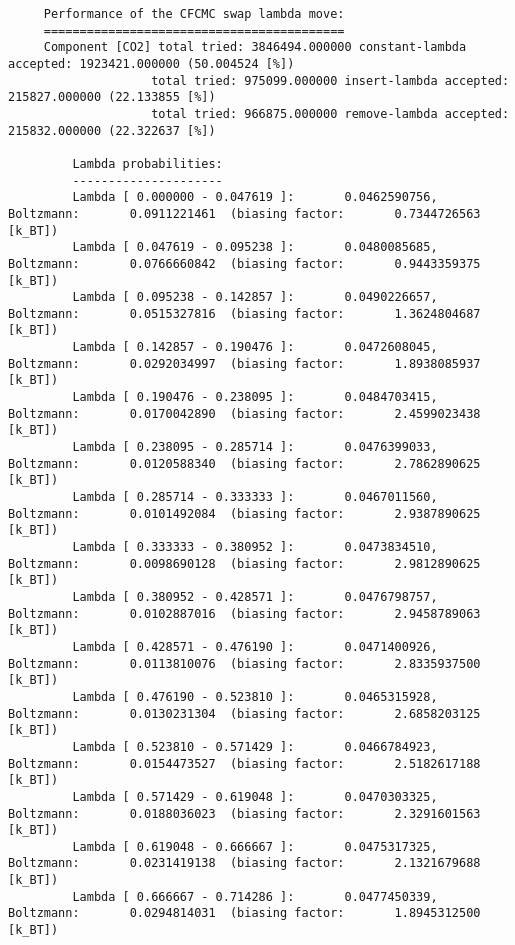 \begin{tiny}
\begin{verbatim}
     Performance of the CFCMC swap lambda move:
     ==========================================
     Component [CO2] total tried: 3846494.000000 constant-lambda accepted: 1923421.000000 (50.004524 [%])
                    total tried: 975099.000000 insert-lambda accepted: 215827.000000 (22.133855 [%])
                    total tried: 966875.000000 remove-lambda accepted: 215832.000000 (22.322637 [%])

         Lambda probabilities:
         ---------------------
         Lambda [ 0.000000 - 0.047619 ]:       0.0462590756, Boltzmann:       0.0911221461  (biasing factor:       0.7344726563 [k_BT])
         Lambda [ 0.047619 - 0.095238 ]:       0.0480085685, Boltzmann:       0.0766660842  (biasing factor:       0.9443359375 [k_BT])
         Lambda [ 0.095238 - 0.142857 ]:       0.0490226657, Boltzmann:       0.0515327816  (biasing factor:       1.3624804687 [k_BT])
         Lambda [ 0.142857 - 0.190476 ]:       0.0472608045, Boltzmann:       0.0292034997  (biasing factor:       1.8938085937 [k_BT])
         Lambda [ 0.190476 - 0.238095 ]:       0.0484703415, Boltzmann:       0.0170042890  (biasing factor:       2.4599023438 [k_BT])
         Lambda [ 0.238095 - 0.285714 ]:       0.0476399033, Boltzmann:       0.0120588340  (biasing factor:       2.7862890625 [k_BT])
         Lambda [ 0.285714 - 0.333333 ]:       0.0467011560, Boltzmann:       0.0101492084  (biasing factor:       2.9387890625 [k_BT])
         Lambda [ 0.333333 - 0.380952 ]:       0.0473834510, Boltzmann:       0.0098690128  (biasing factor:       2.9812890625 [k_BT])
         Lambda [ 0.380952 - 0.428571 ]:       0.0476798757, Boltzmann:       0.0102887016  (biasing factor:       2.9458789063 [k_BT])
         Lambda [ 0.428571 - 0.476190 ]:       0.0471400926, Boltzmann:       0.0113810076  (biasing factor:       2.8335937500 [k_BT])
         Lambda [ 0.476190 - 0.523810 ]:       0.0465315928, Boltzmann:       0.0130231304  (biasing factor:       2.6858203125 [k_BT])
         Lambda [ 0.523810 - 0.571429 ]:       0.0466784923, Boltzmann:       0.0154473527  (biasing factor:       2.5182617188 [k_BT])
         Lambda [ 0.571429 - 0.619048 ]:       0.0470303325, Boltzmann:       0.0188036023  (biasing factor:       2.3291601563 [k_BT])
         Lambda [ 0.619048 - 0.666667 ]:       0.0475317325, Boltzmann:       0.0231419138  (biasing factor:       2.1321679688 [k_BT])
         Lambda [ 0.666667 - 0.714286 ]:       0.0477450339, Boltzmann:       0.0294814031  (biasing factor:       1.8945312500 [k_BT])

\end{verbatim}
\end{tiny}
